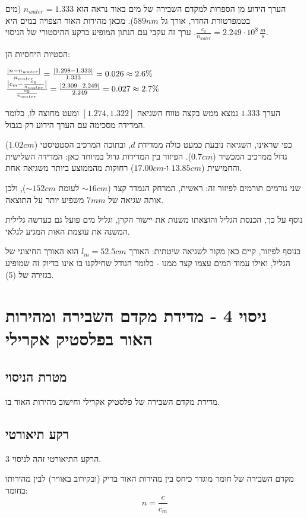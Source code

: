 \documentclass[14pt]{extarticle}
\makeatletter
\newenvironment{lefteqs}{%
    \begin{english}%
    \begin{flushleft}%
    \renewcommand{\arraystretch}{1.3}%
    $\begin{array}{@{}l@{}}%
}{%
    \end{array}$%
    \end{flushleft}%
    \end{english}%
}
\makeatother
\begin{document}
הערך הידוע מן הספרות למקדם השבירה של מים באור נראה הוא $n_{water} = 1.333$
(מים בטמפרטורת החדר, אורך גל $589nm$). מכאן מהירות האור הצפויה במים היא
$\frac{c_0}{n_{water}} = 2.249 \cdot 10^8\,\frac{m}{s}$. ערך זה עקבי עם הנתון המופיע ברקע ההיסטורי של הניסוי.

הסטיות היחסיות הן:
\begin{lefteqs}
    \frac{\left| n - n_{water} \right|}{n_{water}} = \frac{\left| 1.298 - 1.333 \right|}{1.333} = 0.026 \approx 2.6\% \\
    \frac{\left| c_m - \frac{c_0}{n_{water}} \right|}{\frac{c_0}{n_{water}}} = \frac{\left| 2.309 - 2.249 \right|}{2.249} = 0.027 \approx 2.7\%
\end{lefteqs}

הערך $1.333$ נמצא ממש בקצה טווח השגיאה $[1.274, 1.322]$ ומעט מחוצה לו, כלומר המדידה מסכימה עם
הערך הידוע רק בגבול.

כפי שראינו, השגיאה נובעת כמעט כולה ממדידת $d$, ובתוכה המרכיב הסטטיסטי
($1.02cm$) גדול ממרכיב המכשיר ($0.7cm$). הפיזור בין המדידות גדול במיוחד כאן:
המדידה השלישית והחמישית ($13.85cm$ ו-$17.00cm$) רחוקות מהממוצע ביותר משגיאה אחת.

שני גורמים תורמים לפיזור זה: ראשית, המרחק
הנמדד קצר ($\sim 16cm$ לעומת $\sim 152cm$), ולכן אותה שגיאה של $7mm$ משפיע יותר על התוצאה.

נוסף על כך, הכנסת הגליל והוצאתו משנות את יישור הקרן, וגליל
מים פועל גם כעדשה גלילית המשנה את עוצמת האות המגיע לגלאי.

בנוסף לפיזור, קיים כאן מקור לשגיאה שיטתית: האורך $l_m = 52.5cm$ הוא האורך החיצוני
של הגליל, ואילו עמוד המים עצמו קצר ממנו - כלומר הגודל שחילקנו בו אינו בדיוק זה
שמופיע בגזירה של (5).

\newpage
\section*{ניסוי 4 - מדידת מקדם השבירה ומהירות האור בפלסטיק אקרילי}

\subsection*{מטרת הניסוי}
מדידת מקדם השבירה של פלסטיק אקרילי וחישוב מהירות האור בו.

\subsection*{רקע תיאורטי}
הרקע התיאורטי זהה לניסוי 3.

מקדם השבירה של חומר מוגדר כיחס בין מהירות האור בריק (ובקירוב באוויר) לבין מהירותו בחומר:
\begin{equation}
    n = \frac{c}{c_m}
\end{equation}
\end{document}
